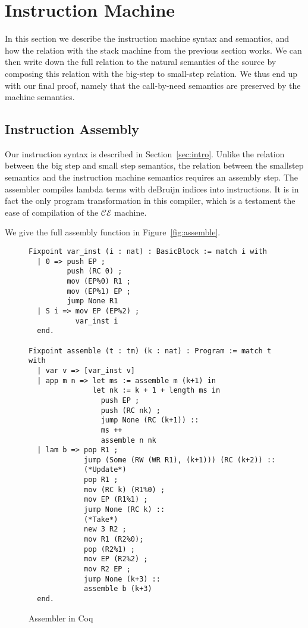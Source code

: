\section{Instruction Machine} \label{sec:mach}

In this section we describe the instruction machine syntax and semantics, and
how the relation with the stack machine from the previous section works. We can
then write down the full relation to the natural semantics of the source by
composing this relation with the big-step to small-step relation. We thus end
up with our final proof, namely that the call-by-need semantics are preserved
by the machine semantics. 

\subsection{Instruction Assembly}

Our instruction syntax is described in Section~\ref{sec:intro}. Unlike the
relation between the big step and small step semantics, the relation between
the smallstep semantics and the instruction machine semantics requires an 
assembly step. The assembler compiles lambda terms with deBruijn indices into
instructions. It is in fact the only program transformation in this compiler, 
which is a testament the ease of compilation of the $\mathcal{CE}$ machine.

We give the full assembly function in Figure~\ref{fig:assemble}. 

\begin{figure}
\begin{lstlisting}
Fixpoint var_inst (i : nat) : BasicBlock := match i with
  | 0 => push EP ;
         push (RC 0) ;
         mov (EP%0) R1 ;
         mov (EP%1) EP ;
         jump None R1
  | S i => mov EP (EP%2) ;
           var_inst i
  end.

Fixpoint assemble (t : tm) (k : nat) : Program := match t with  
  | var v => [var_inst v]
  | app m n => let ms := assemble m (k+1) in
               let nk := k + 1 + length ms in
                 push EP ;
                 push (RC nk) ;
                 jump None (RC (k+1)) :: 
                 ms ++ 
                 assemble n nk
  | lam b => pop R1 ;
             jump (Some (RW (WR R1), (k+1))) (RC (k+2)) ::
             (*Update*)
             pop R1 ;  
             mov (RC k) (R1%0) ;
             mov EP (R1%1) ;
             jump None (RC k) ::
             (*Take*)
             new 3 R2 ;
             mov R1 (R2%0);
             pop (R2%1) ;
             mov EP (R2%2) ;
             mov R2 EP ;
             jump None (k+3) ::
             assemble b (k+3)
  end. 
\end{lstlisting}
\caption{Assembler in Coq}
\end{figure}

